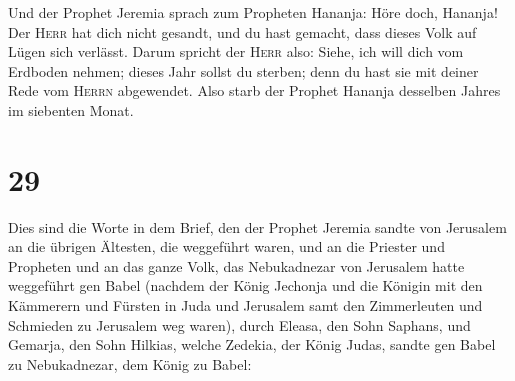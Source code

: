  Und der Prophet Jeremia sprach zum Propheten Hananja:
Höre doch, Hananja! Der \textsc{Herr} hat dich nicht gesandt, und du
hast gemacht, dass dieses Volk auf Lügen sich verlässt. 
Darum spricht der \textsc{Herr} also: Siehe, ich will dich vom Erdboden
nehmen; dieses Jahr sollst du sterben; denn du hast sie mit deiner Rede
vom \textsc{Herrn} abgewendet.  Also starb der Prophet
Hananja desselben Jahres im siebenten Monat.

\hypertarget{section-28}{%
\section{29}\label{section-28}}

 Dies sind die Worte in dem Brief, den der Prophet Jeremia
sandte von Jerusalem an die übrigen Ältesten, die weggeführt waren, und
an die Priester und Propheten und an das ganze Volk, das Nebukadnezar
von Jerusalem hatte weggeführt gen Babel  (nachdem der
König Jechonja und die Königin mit den Kämmerern und Fürsten in Juda und
Jerusalem samt den Zimmerleuten und Schmieden zu Jerusalem weg waren),
 durch Eleasa, den Sohn Saphans, und Gemarja, den Sohn
Hilkias, welche Zedekia, der König Judas, sandte gen Babel zu
Nebukadnezar, dem König zu Babel:


